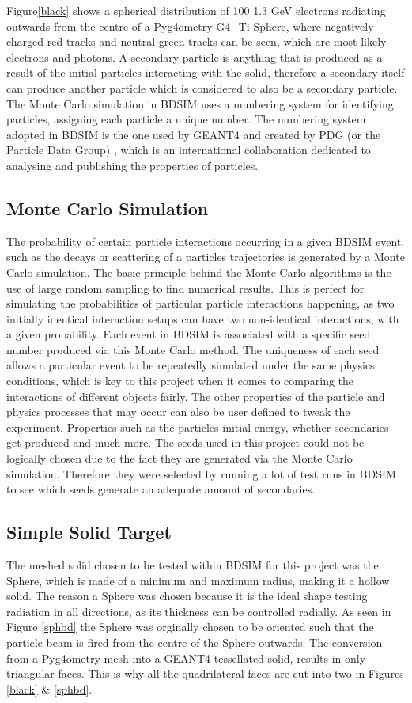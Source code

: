 \documentclass[12pt,a4paper]{article}
\begin{document}
\noindent Figure\ref{black} shows a spherical distribution of 100 1.3 GeV electrons radiating outwards from the centre of a Pyg4ometry G4\_Ti Sphere, where negatively charged red tracks and neutral green tracks can be seen, which are most likely electrons and photons. A secondary particle is anything that is produced as a result of the initial particles interacting with the solid, therefore a secondary itself can produce another particle which is considered to also be  a secondary particle. The Monte Carlo simulation in BDSIM uses a numbering system for identifying particles, assigning each particle a unique number. The numbering system adopted in BDSIM is the one used by GEANT4 and created by PDG (or the Particle Data Group) \cite{pdg}, which is an international collaboration dedicated to analysing and publishing the properties of particles. 

\subsection{Monte Carlo Simulation}
\label{monte}
\noindent The probability of certain particle interactions occurring in a given BDSIM event, such as the decays or scattering of a particles trajectories is generated by a Monte Carlo simulation. The basic principle behind the Monte Carlo algorithms is the use of large random sampling to find numerical results. This is perfect for simulating the probabilities of particular particle interactions happening, as two initially identical interaction setups can have two non-identical interactions, with a given probability. Each event in BDSIM is associated with a specific seed number produced via this Monte Carlo method. The uniqueness of each seed allows a particular event to be repeatedly simulated under the same physics conditions, which is key to this project when it comes to comparing the interactions of different objects fairly. The other properties of the particle and physics processes that may occur can also be user defined to tweak the experiment. Properties such as the particles initial energy, whether secondaries get produced and much more. The seeds used in this project could not be logically chosen due to the fact they are generated via the Monte Carlo simulation. Therefore they were selected by running a lot of test runs in BDSIM to see which seeds generate an adequate amount of secondaries.

\subsection{Simple Solid Target}
The meshed solid chosen to be tested within BDSIM for this project was the Sphere, which is made of a minimum and maximum radius, making it a hollow solid. The reason a Sphere was chosen because it is the ideal shape testing radiation in all directions, as its thickness can be controlled radially. As seen in Figure \ref{sphbd} the Sphere was orginally chosen to be oriented such that the particle beam is fired from the centre of the Sphere outwards. The conversion from a Pyg4ometry mesh into a GEANT4 tessellated solid, results in only triangular faces. This is why all the quadrilateral faces are cut into two in Figures \ref{black} \& \ref{sphbd}.
\end{document}
